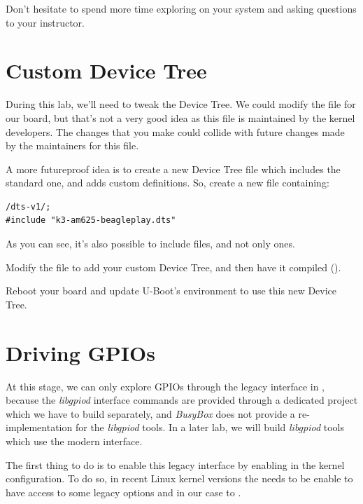 Don't hesitate to spend more time exploring  on your system
and asking questions to your instructor.

\section{Custom Device Tree}
During this lab, we'll need to tweak the Device Tree. We could modify the
 file for our board,
but that's not a very good idea as this file is maintained by the kernel
developers. The changes that you make could collide with future changes made by
the maintainers for this file.

A more futureproof idea is to create a new Device Tree file which
includes the standard one, and adds custom definitions. So, create a
new  file containing:

\begin{verbatim}
/dts-v1/;
#include "k3-am625-beagleplay.dts"
\end{verbatim}

As you can see, it's also possible to include  files, and not
only  ones.

Modify the  file to add your custom
Device Tree, and then have it compiled ().

Reboot your board and update U-Boot's environment to use this new Device Tree.

\section{Driving GPIOs}

At this stage, we can only explore GPIOs through the legacy interface
in , because the {\em libgpiod} interface
commands are provided through a dedicated project which we have to
build separately, and {\em BusyBox} does not provide a
re-implementation for the {\em libgpiod} tools. In a later lab, we
will build {\em libgpiod} tools which use the modern
 interface.

The first thing to do is to enable this legacy interface by enabling
 in the kernel configuration.
To do so, in recent Linux kernel versions the 
needs to be enable to have access to some legacy options and in our
case to .

